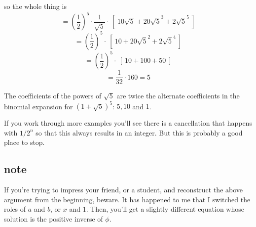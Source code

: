\documentclass[11pt, oneside]{article}
\begin{document}
so the whole thing is
\[ = (\frac{1}{2})^5 \cdot \frac{1}{\sqrt{5}} \cdot \ [ \ 10 \sqrt{5} + 20 \sqrt{5}^3 + 2 \sqrt{5}^5 \ ] \]
\[ = (\frac{1}{2})^5 \cdot \ [ \ 10 + 20 \sqrt{5}^2 + 2 \sqrt{5}^4 \ ] \]
\[ = (\frac{1}{2})^5 \cdot \ [ \ 10 + 100 + 50 \ ] \]
\[ = \frac{1}{32} \cdot 160 = 5 \]

The coefficients of the powers of $\sqrt{5}$ are twice the alternate coefficients in the binomial expansion for $(1 + \sqrt{5})^5$:  $5, 10$ and $1$.  

If you work through more examples you'll see there is a cancellation that happens with $1/2^n$ so that this always results in an integer.  But this is probably a good place to stop.

\subsection*{note}

If you're trying to impress your friend, or a student, and reconstruct the above argument from the beginning, beware.  It has happened to me that I switched the roles of $a$ and $b$, or $x$ and $1$.  Then, you'll get a slightly different equation whose solution is the positive inverse of $\phi$.
\end{document}
